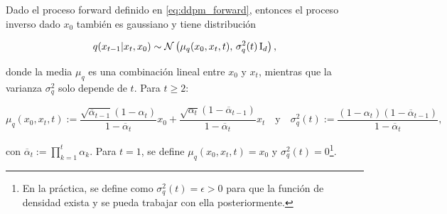 \begin{prop}
    \label{prop:conditional_backward}
    Dado el proceso forward definido en \eqref{eq:ddpm_forward}, entonces el proceso inverso dado $x_0$ también es gaussiano y tiene distribución

    \begin{equation}
        \label{eq:conditional_backward}
        q(x_{t-1}|x_t,x_0) \sim \mathcal{N}\left(\mu_q(x_0,x_t,t),\,\sigma_q^2(t)\operatorname{I}_{d}\right),
    \end{equation}

    donde la media $\mu_q$ es una combinación lineal entre $x_0$ y $x_t$, mientras que la varianza $\sigma_q^2$ solo depende de $t$. Para $t\geq 2$:

    \begin{equation}
        \label{eq:conditional_backward_params}
        \mu_q(x_0,x_t, t) := \frac{\sqrt{\overline{\alpha}_{t-1}}(1-\alpha_t)}{1-\overline{\alpha}_t}x_0 + \frac{\sqrt{\alpha_t}(1-\overline{\alpha}_{t-1})}{1-\overline{\alpha}_t}x_t
        \quad\text{y}\quad
        \sigma_q^2(t) := \frac{(1-\alpha_t)(1-\overline{\alpha}_{t-1})}{1-\overline{\alpha}_t},
    \end{equation}

    con $\overline{\alpha}_t := \prod\limits_{k=1}^t \alpha_k$. Para $t=1$, se define $\mu_q(x_0,x_t,t)=x_0$ y $\sigma_q^2(t)=0$\footnote{En la práctica, se define como $\sigma_q^2(t)=\epsilon>0$ para que la función de densidad exista y se pueda trabajar con ella posteriormente.}.
\end{prop}

